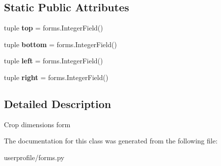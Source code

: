 \subsection*{Static Public Attributes}
\begin{DoxyCompactItemize}
\item 
\hypertarget{classsouvenir_1_1userprofile_1_1forms_1_1AvatarCropForm_a18dbaec2586b47361bd97fa38e82eea7}{tuple {\bfseries top} = forms.\-Integer\-Field()}\label{classsouvenir_1_1userprofile_1_1forms_1_1AvatarCropForm_a18dbaec2586b47361bd97fa38e82eea7}

\item 
\hypertarget{classsouvenir_1_1userprofile_1_1forms_1_1AvatarCropForm_a10993e829cd809bbfd80031ac80ccab3}{tuple {\bfseries bottom} = forms.\-Integer\-Field()}\label{classsouvenir_1_1userprofile_1_1forms_1_1AvatarCropForm_a10993e829cd809bbfd80031ac80ccab3}

\item 
\hypertarget{classsouvenir_1_1userprofile_1_1forms_1_1AvatarCropForm_a423df4a039c4e8c244eda7327e8f41a0}{tuple {\bfseries left} = forms.\-Integer\-Field()}\label{classsouvenir_1_1userprofile_1_1forms_1_1AvatarCropForm_a423df4a039c4e8c244eda7327e8f41a0}

\item 
\hypertarget{classsouvenir_1_1userprofile_1_1forms_1_1AvatarCropForm_ab1eb43998ee3e682003fc5c7ff261c63}{tuple {\bfseries right} = forms.\-Integer\-Field()}\label{classsouvenir_1_1userprofile_1_1forms_1_1AvatarCropForm_ab1eb43998ee3e682003fc5c7ff261c63}

\end{DoxyCompactItemize}


\subsection{Detailed Description}
\begin{DoxyVerb}Crop dimensions form
\end{DoxyVerb}
 

The documentation for this class was generated from the following file\-:\begin{DoxyCompactItemize}
\item 
userprofile/forms.\-py\end{DoxyCompactItemize}

